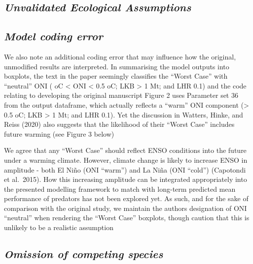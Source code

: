 \documentclass[]{elsarticle} %
\begin{document}
\subsection{\texorpdfstring{\emph{Unvalidated Ecological
Assumptions}}{Unvalidated Ecological Assumptions}}\label{unvalidated-ecological-assumptions}

\subsection{\texorpdfstring{\emph{Model coding
error}}{Model coding error}}\label{model-coding-error}

We also note an additional coding error that may influence how the
original, unmodified results are interpreted. In summarising the model
outputs into boxplots, the text in the paper seemingly classifies the
``Worst Case'' with ``neutral'' ONI ( oC \textless{} ONI \textless{} 0.5
oC; LKB \textgreater{} 1 Mt; and LHR 0.1) and the code relating to
developing the original manuscript Figure 2 uses Parameter set 36 from
the output dataframe, which actually reflects a ``warm'' ONI component
(\textgreater{} 0.5 oC; LKB \textgreater{} 1 Mt; and LHR 0.1). Yet the
discussion in Watters, Hinke, and Reiss (2020) also suggests that the
likelihood of their ``Worst Case'' includes future warming (see Figure 3
below)

We agree that any ``Worst Case'' should reflect ENSO conditions into the
future under a warming climate. However, climate change is likely to
increase ENSO in amplitude - both El Niño (ONI ``warm'') and La Niña
(ONI ``cold'') (Capotondi et al.~2015). How this increasing amplitude
can be integrated appropriately into the presented modelling framework
to match with long-term predicted mean performance of predators has not
been explored yet. As such, and for the sake of comparison with the
original study, we maintain the authors designation of ONI ``neutral''
when rendering the ``Worst Case'' boxplots, though caution that this is
unlikely to be a realistic assumption

\subsection{\texorpdfstring{\emph{Omission of competing
species}}{Omission of competing species}}\label{omission-of-competing-species-1}
\end{document}
